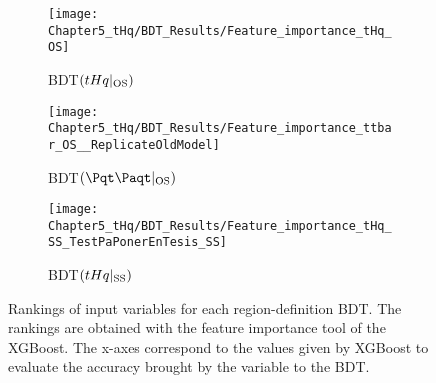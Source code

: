 \begin{figure}[h]
  \centering  
  \begin{subfigure}[b]{0.49\textwidth}
    \centering
    \texttt{[image: Chapter5\_tHq/BDT\_Results/Feature\_importance\_tHq\_OS]}
    \caption{BDT$(tHq|_{\text{OS}})$}
     \label{fig:ChaptH:EventSelection:BDT:Rankings:tHqOS}
  \end{subfigure}
  \hfill
  \begin{subfigure}[b]{0.49\textwidth}
    \centering
    \texttt{[image: Chapter5\_tHq/BDT\_Results/Feature\_importance\_ttbar\_OS\_\_ReplicateOldModel]}
    \caption{BDT$(\ttbar|_{\text{OS}})$}
     \label{fig:ChaptH:EventSelection:BDT:Rankings:ttbarOS}
  \end{subfigure}
    \hfill
  \begin{subfigure}[b]{0.49\textwidth}
    \centering
    \texttt{[image: Chapter5\_tHq/BDT\_Results/Feature\_importance\_tHq\_SS\_TestPaPonerEnTesis\_SS]}
    \caption{BDT$(tHq|_{\text{SS}})$}
     \label{fig:ChaptH:EventSelection:BDT:Rankings:tHqSS}
  \end{subfigure}
  \caption{Rankings of input variables for each region-definition BDT. The rankings are obtained 
  with the feature importance tool of the XGBoost. The x-axes correspond to the values given by XGBoost to 
  evaluate the accuracy brought by the variable to the BDT.} %
  \label{fig:ChaptH:EventSelection:BDT:Rankings}
\end{figure}




